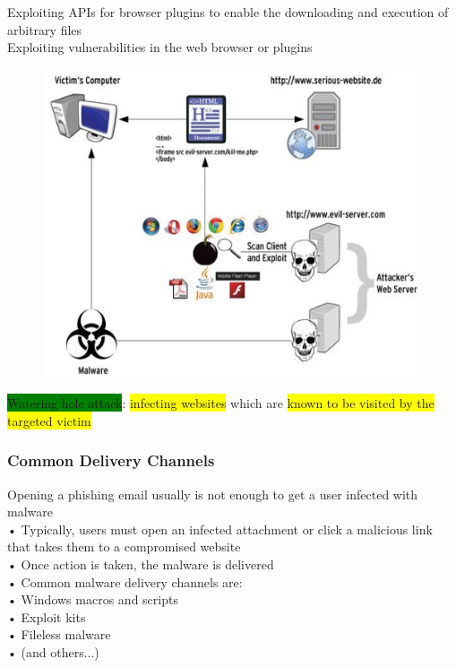\documentclass[]{project_plan}
\begin{document}
Exploiting APIs for browser plugins to enable the downloading and execution of arbitrary files\\
Exploiting vulnerabilities in the web browser or plugins

\begin{figure}[H]
  \centering
  \includegraphics[width=.5\linewidth]{drive by download.png}
\end{figure}

\colorbox{green}{Watering hole attack}: \colorbox{yellow}{infecting websites} which are \colorbox{yellow}{known to be visited by the targeted victim}

\subsubsection{Common Delivery Channels}

Opening a phishing email usually is not enough to get a user infected with malware\\
• Typically, users must open an infected attachment or click a malicious link that takes them to a compromised website\\
• Once action is taken, the malware is delivered\\
• Common malware delivery channels are:\\
• Windows macros and scripts\\
• Exploit kits\\
• Fileless malware\\
• (and others...)
\end{document}
